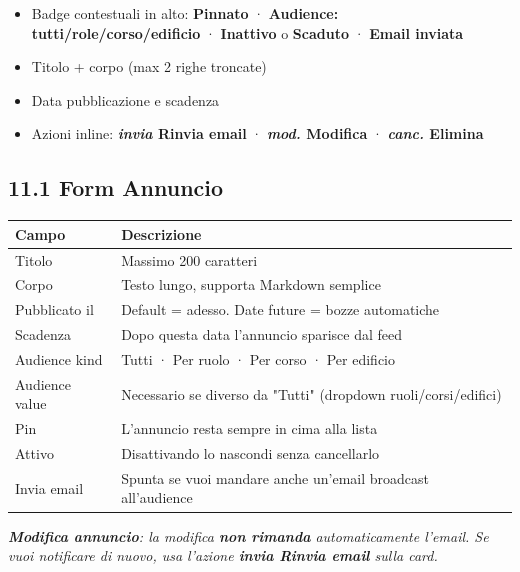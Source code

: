 \documentclass[11pt,a4paper]{article}
\renewenvironment{quote}
  {\begin{list}{}{%
      \setlength{\leftmargin}{8pt}%
      \setlength{\rightmargin}{8pt}%
      \setlength{\topsep}{6pt}%
      \setlength{\parsep}{0pt}}%
      \item\relax\color{black!75}\itshape}
  {\end{list}}
\begin{document}
\begin{itemize}
  \item Badge contestuali in alto: \textbf{Pinnato} · \textbf{Audience: tutti/role/corso/edificio} · \textbf{Inattivo} o \textbf{Scaduto} · \textbf{Email inviata}
  \item Titolo + corpo (max 2 righe troncate)
  \item Data pubblicazione e scadenza
  \item Azioni inline: \textbf{\textit{invia} Rinvia email} · \textbf{\textit{mod.} Modifica} · \textbf{\textit{canc.} Elimina}
\end{itemize}

\subsection{11.1 Form Annuncio}


\begin{table}[H]
\centering
\small
\begin{tabularx}{\linewidth}{|X|X|}
\hline
\rowcolor{tableheader} Campo & Descrizione \\
\hline
Titolo & Massimo 200 caratteri \\
\hline
Corpo & Testo lungo, supporta Markdown semplice \\
\hline
Pubblicato il & Default = adesso. Date future = bozze automatiche \\
\hline
Scadenza & Dopo questa data l'annuncio sparisce dal feed \\
\hline
Audience kind & Tutti · Per ruolo · Per corso · Per edificio \\
\hline
Audience value & Necessario se diverso da "Tutti" (dropdown ruoli/corsi/edifici) \\
\hline
Pin & L'annuncio resta sempre in cima alla lista \\
\hline
Attivo & Disattivando lo nascondi senza cancellarlo \\
\hline
Invia email & Spunta se vuoi mandare anche un'email broadcast all'audience \\
\hline
\end{tabularx}
\end{table}


\begin{quote}
\textbf{Modifica annuncio}: la modifica \textbf{non rimanda} automaticamente l'email. Se vuoi notificare di nuovo, usa l'azione \textbf{\textit{invia} Rinvia email} sulla card.
\end{quote}
\end{document}
